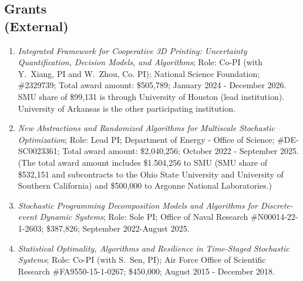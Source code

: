 \documentclass[hyperref, margin]{myResume}
\newif\ifpublic
\begin{document}
\begin{resume}
\section{Grants\\(External)}
\begin{enumerate}[label=G\arabic*., leftmargin=*]
	\item \emph{Integrated Framework for Cooperative 3D Printing: Uncertainty Quantification, Decision Models, and Algorithms}; Role: Co-PI (with Y.\ Xiang, PI and W.\ Zhou, Co. PI); National Science Foundation; \#2329739; Total award amount: \$505,789; January 2024 - December 2026.\ifpublic \else \\ SMU share of \$99,131 is through University of Houston (lead institution). University of Arkansas is the other participating institution. \fi
	\item \emph{New Abstractions and Randomized Algorithms for Multiscale Stochastic Optimization}; Role: Lead PI; Department of Energy - Office of Science; \#DE-SC0023361; Total award amount: \$2,040,256; October 2022 - September 2025.\ifpublic \else \\
	(The total award amount includes \$1.504,256 to SMU (SMU share of \$532,151 and subcontracts to the Ohio State University and University of Southern California) and \$500,000 to Argonne National Laboratories.) \fi
	\item \emph{Stochastic Programming Decomposition Models and Algorithms for Discrete-event Dynamic Systems}; Role: Sole PI; Office of Naval Research \#N00014-22-1-2603; \$387,826; September 2022-August 2025.
	\item \emph{Statistical Optimality, Algorithms and Resilience in Time-Staged Stochastic Systems}; Role: Co-PI (with S.\ Sen, PI); Air Force Office of Scientific Research \#FA9550-15-1-0267; \$450,000; August 2015 - December 2018.
\end{enumerate}


\end{resume}
\end{document}
